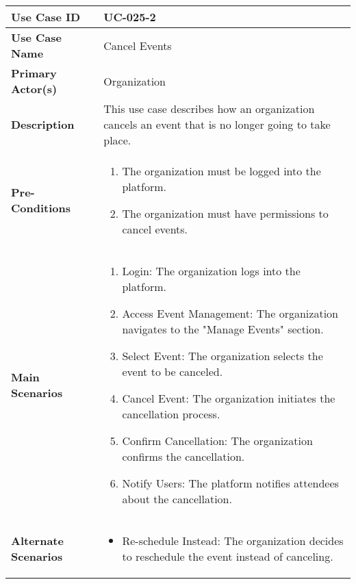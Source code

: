 \begin{table}[!ht]
    \centering
    \renewcommand{\arraystretch}{1.3} %
    \begin{tabularx}{\textwidth}{|l|X|}
        \hline
        \textbf{Use Case ID} & UC-025-2 \\
        \hline
        \textbf{Use Case Name} & Cancel Events \\
        \hline
        \textbf{Primary Actor(s)} & Organization \\
        \hline
        \textbf{Description} & This use case describes how an organization cancels an event that is no longer going to take place. \\
        \hline
        \textbf{Pre-Conditions} & 
        \begin{enumerate}[label=\arabic*.,itemsep=0pt]
            \item The organization must be logged into the platform.
            \item The organization must have permissions to cancel events.
        \end{enumerate} \\
        \hline
        \textbf{Main Scenarios} & 
        \begin{enumerate}[label=\arabic*.,itemsep=0pt]
            \item Login: The organization logs into the platform.
            \item Access Event Management: The organization navigates to the "Manage Events" section.
            \item Select Event: The organization selects the event to be canceled.
            \item Cancel Event: The organization initiates the cancellation process.
            \item Confirm Cancellation: The organization confirms the cancellation.
            \item Notify Users: The platform notifies attendees about the cancellation.
        \end{enumerate} \\
        \hline
        \textbf{Alternate Scenarios} & 
        \begin{itemize}[label=--,itemsep=0pt]
            \item Re-schedule Instead: The organization decides to reschedule the event instead of canceling.
        \end{itemize} \\

\end{tabularx}
\end{table}
